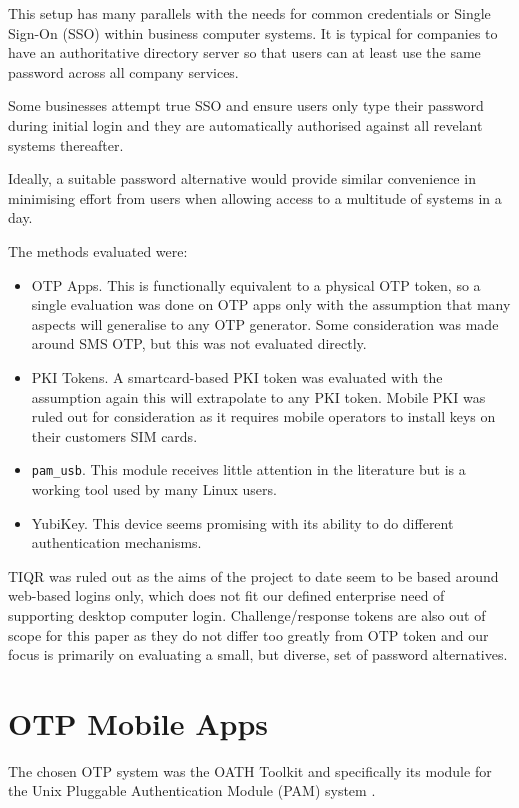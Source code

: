 \documentclass{report}
\begin{document}
This setup has many parallels with the needs for common credentials or
Single Sign-On (SSO) within business computer systems. It is typical for
companies to have an authoritative directory server so that users
can at least use the same password across all company services.

Some businesses
attempt true SSO and ensure users only type their password during initial
login and they are automatically authorised against all revelant systems
thereafter.

Ideally, a suitable password alternative would provide similar
convenience in minimising effort from users when allowing access to a multitude
of systems in a day.

The methods evaluated were:

\begin{itemize}
  \item OTP Apps. This is functionally equivalent to a physical OTP token,
    so a single evaluation was done on OTP apps only with the assumption that
    many aspects will generalise to any OTP generator. Some consideration
    was made around SMS OTP, but this was not evaluated directly.
  \item PKI Tokens. A smartcard-based PKI token was evaluated with the
    assumption again this will extrapolate to any PKI token. Mobile PKI was
    ruled out for consideration as it requires mobile operators to install
    keys on their customers SIM cards.
  \item \texttt{pam\_usb}. This module receives little attention in the literature
    but is a working tool used by many Linux users.
  \item YubiKey. This device seems promising with its ability to do different
    authentication mechanisms.
\end{itemize}

TIQR was ruled out as the aims of the project to date seem to be based around
web-based logins only, which does not fit our defined enterprise need of
supporting desktop computer login. Challenge/response tokens are also
out of scope for this paper as they do not differ too greatly from OTP
token and our focus is primarily on evaluating a small, but diverse, set
of password alternatives.

\section{OTP Mobile Apps}
\label{sec:otp}

The chosen OTP system was the OATH Toolkit and specifically its
module for the Unix Pluggable Authentication Module (PAM) system
\parencite{samar1996unified}.
\end{document}
